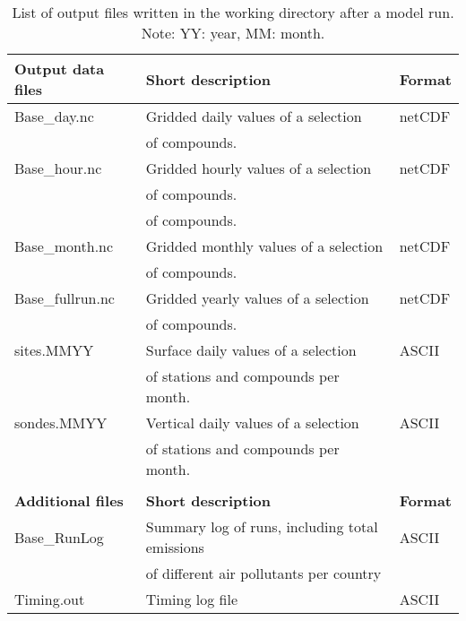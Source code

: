 \begin{table}[h!]
\caption[List of model output files]{List of output files written in the
  working directory after a  model run. 
Note: YY: year, MM: month.}\label{tab:output}
\begin{center}
\hspace{-1cm}
\begin{tabular}{lll}
\hline
{\bf Output data files} &  {\bf Short description} & {\bf Format}\\
\hline
    Base\_day.nc & Gridded daily values of a selection & netCDF\\
&   of compounds.& \\ 
    Base\_hour.nc &Gridded hourly values of a selection &
    netCDF\\  
 &  of compounds.& \\
 &  of compounds.& \\
    Base\_month.nc & Gridded monthly values of a selection&
    netCDF\\
 &  of compounds.& \\
    Base\_fullrun.nc & Gridded yearly values of a selection&
    netCDF\\
 &  of compounds. & \\
    sites.MMYY & Surface daily values of a selection&  ASCII\\
 & of stations and compounds per month.& \\
    sondes.MMYY & Vertical daily values of a selection& ASCII\\
 &  of stations and compounds per month.& \\
& &\\ \hline
{\bf Additional files} &  {\bf Short description} & {\bf Format}\\
    Base\_RunLog & Summary log of runs, including total emissions  & ASCII\\
 &  of different air pollutants per country& \\
Timing.out & Timing log file& ASCII \\
 
\hline
\end{tabular}
\end{center}

\label{Tab:outputs}
\end{table}


